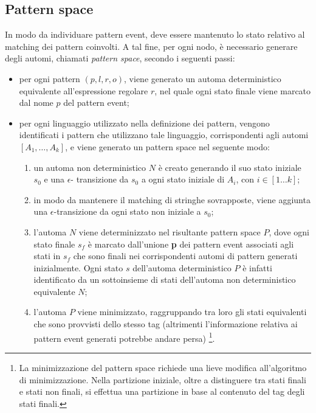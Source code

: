 \subsection{Pattern space} \label{pts_construction}
In modo da individuare pattern event, deve essere mantenuto lo stato relativo al matching dei pattern coinvolti. A tal fine, per ogni nodo, è necessario generare degli automi, chiamati \emph{pattern space}, secondo i seguenti passi:
\begin{itemize}
\item per ogni pattern $(p,l,r,o)$, viene generato un automa deterministico equivalente all'espressione regolare $r$, nel quale ogni stato finale viene marcato dal nome $p$ del pattern event;
\item per ogni linguaggio utilizzato nella definizione dei pattern, vengono identificati i pattern che utilizzano tale linguaggio, corrispondenti agli automi $[A_1, \ldots , A_k]$, e viene generato un pattern space nel seguente modo:
	\begin{enumerate}
	\item un automa non deterministico $N$ è creato generando il suo stato iniziale $s_0$ e una $\epsilon$-			transizione da $s_0$ a ogni stato iniziale di $A_i$, con $i \in [1 \ldots k]$;
	\item in modo da mantenere il matching di stringhe sovrapposte, viene aggiunta una $\epsilon$-transizione	da ogni stato non iniziale a $s_0$;
	\item l'automa $N$ viene determinizzato nel risultante pattern space $P$, dove ogni stato finale $s_f$ è marcato dall'unione \textbf{p} dei pattern event associati agli stati in $s_f$ che sono finali nei corrispondenti automi di pattern generati inizialmente. Ogni stato $s$ dell'automa deterministico $P$ è infatti identificato da un sottoinsieme di stati dell'automa non deterministico equivalente $N$;
	\item l'automa $P$ viene minimizzato, raggruppando tra loro gli stati equivalenti che sono provvisti dello stesso tag (altrimenti l'informazione relativa ai pattern event generati potrebbe andare persa) \footnote{La minimizzazione del pattern space richiede una lieve modifica all'algoritmo di minimizzazione. Nella partizione iniziale, oltre a distinguere tra stati finali e stati non finali, si effettua una partizione in base al contenuto del tag degli stati finali.}.
	\end{enumerate}
\end{itemize}

